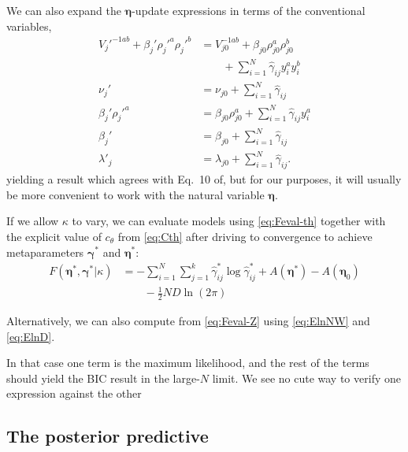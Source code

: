 \documentclass[aps,showpacs,twocolumn,prd,superscriptaddress,nofootinbib]{revtex4}
\newcommand{\nn}{\nonumber}
\begin{document}
We can also expand the $\bm\eta$-update expressions in terms of the conventional variables, 
\begin{align}
  V_j'^{-1ab}+\beta_j'\rho_j'^a\rho_j'^b
  &=  V_{j0}^{-1ab}+\beta_{j0}\rho_{j0}^a\rho_{j0}^b
  \nn\\&\qquad
  +\sum_{i=1}^N\hat\gamma_{ij}y_i^ay_i^b 
  \nn\\
  \nu_j'
  &=\nu_{j0}
    +\sum_{i=1}^N\hat\gamma_{ij}
  \nn\\
  \beta_j'\rho_j'^a
  &=  \beta_{j0}\rho_{j0}^a+\sum_{i=1}^N\hat\gamma_{ij}y_i^a 
  \nn\\
  \beta_j'
  &=
  \beta_{j0}+\sum_{i=1}^N\hat\gamma_{ij}
  \nn\\
  \lambda'_{j}&=
  \lambda_{j0}+\sum_{i=1}^N\hat\gamma_{ij}.\label{eq:meta-update}
\end{align}
yielding a result which agrees with Eq.~10 of\cite{Attias2000}, but for our purposes, it will usually be more convenient to work with the natural variable $\bm\eta$.


If we allow $\kappa$ to vary, we can evaluate models using \eqref{eq:Feval-th} together with the explicit value of $c_\theta$ from \eqref{eq:Cth} after driving to convergence to achieve metaparameters $\bm\gamma^*$ and $\bm\eta^*$:
\begin{align}
    F(\bm\eta^*,\bm\gamma^*|\kappa)&=
    -\sum_{i=1}^N\sum_{j=1}^k\hat\gamma^*_{ij}\log\hat\gamma^*_{ij}
    +A(\bm\eta^*)-A(\bm\eta_{0})
  \nn\\&\qquad
  -\frac12ND\ln(2\pi)
\end{align}

Alternatively, we can also compute from \eqref{eq:Feval-Z} using \eqref{eq:ElnNW} and \eqref{eq:ElnD}.

In that case one term is the maximum likelihood, and the rest of the terms should yield the BIC result in the large-$N$ limit.  We see no cute way to verify one expression against the other

\subsection{The posterior predictive}
\end{document}

